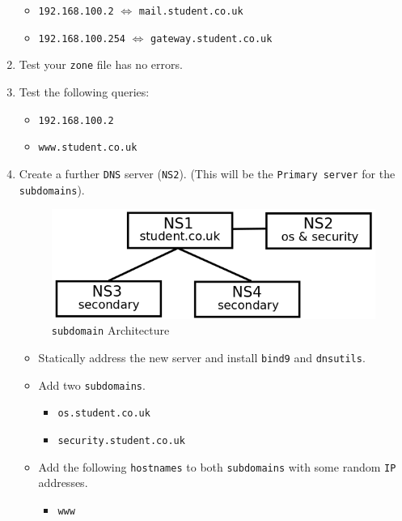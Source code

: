 \documentclass[11pt]{article}
\begin{document}
\begin{enumerate}
\begin{itemize}
            \item \texttt{192.168.100.2} $\Leftrightarrow$ \texttt{mail.student.co.uk}
            \item \texttt{192.168.100.254} $\Leftrightarrow$ \texttt{gateway.student.co.uk}
        \end{itemize}
    \item Test your \texttt{zone} file has no errors.
    \item \label{itm:queries} Test the following queries:
        \begin{itemize}
            \item \texttt{192.168.100.2}
            \item \texttt{www.student.co.uk}
        \end{itemize}
    \item Create a further \texttt{DNS} server (\texttt{NS2}). (This will be the \texttt{Primary server} for the \texttt{subdomains}).
        \begin{figure}[ht]
            \begin{center}
              \includegraphics[width=.5\linewidth]{subdomainWS2.png}  
                \caption{\texttt{subdomain} Architecture}
                \label{dnsarch2}
            \end{center}
        \end{figure}
    \begin{itemize}
            \item Statically address the new server and install \texttt{bind9} and \texttt{dnsutils}.
            \item Add two \texttt{subdomains}.
                \begin{itemize}
                    \item \texttt{os.student.co.uk}
                    \item \texttt{security.student.co.uk}
                \end{itemize}
            \item Add the following \texttt{hostnames} to both \texttt{subdomains} with some random \texttt{IP} addresses.
                \begin{itemize}
                    \item \texttt{www}

\end{itemize}
\end{itemize}
\end{enumerate}
\end{document}
